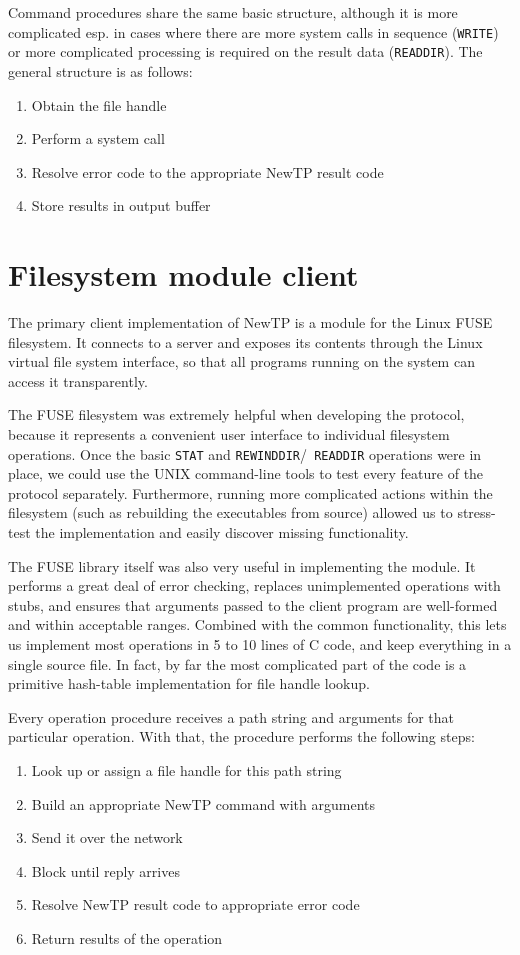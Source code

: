 Command procedures share the same basic structure, although it is more complicated esp. in cases where there
are more system calls in sequence ({\tt WRITE}) or more complicated processing is required on the result data
({\tt READDIR}). The general structure is as follows:
\begin{enumerate}[nolistsep]
	\item Obtain the file handle
	\item Perform a system call
	\item Resolve error code to the appropriate NewTP result code
	\item Store results in output buffer
\end{enumerate}

\section{Filesystem module client}

The primary client implementation of NewTP is a module for the Linux FUSE filesystem. It connects to a server
and exposes its contents through the Linux virtual file system interface, so that all programs running on
the system can access it transparently.

The FUSE filesystem was extremely helpful when developing the protocol, because it represents a convenient
user interface to individual filesystem operations. Once the basic {\tt STAT} and {\tt REWINDDIR}/{\tt
READDIR} operations were in place, we could use the UNIX command-line tools to test every feature of the
protocol separately. Furthermore, running more complicated actions within the filesystem (such as rebuilding
the executables from source) allowed us to stress-test the implementation and easily discover missing
functionality.

The FUSE library itself was also very useful in implementing the module. It performs a great deal of error
checking, replaces unimplemented operations with stubs, and ensures that arguments passed to the client
program are well-formed and within acceptable ranges. Combined with the common functionality, this lets us
implement most operations in 5 to 10 lines of C code, and keep everything in a single source file. In fact, by
far the most complicated part of the code is a primitive hash-table implementation for file handle lookup.

Every operation procedure receives a path string and arguments for that particular operation. With that, the
procedure performs the following steps:
\begin{enumerate}[nolistsep]
	\item Look up or assign a file handle for this path string
	\item Build an appropriate NewTP command with arguments
	\item Send it over the network
	\item Block until reply arrives
	\item Resolve NewTP result code to appropriate error code
	\item Return results of the operation
\end{enumerate}

